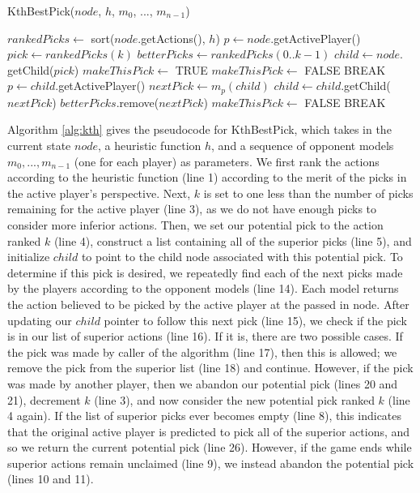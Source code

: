 \documentclass[letterpaper]{article}
\numberwithin{equation}{section}
\numberwithin{theorem}{section}
\numberwithin{lemma}{section}
\numberwithin{df}{section}
\begin{document}
\begin{algorithm}[t]
	\caption{KthBestPick($node$, $h$, $m_0$, ..., $m_{n-1}$)}
	\label{alg:kth}
	\begin{footnotesize}
	\begin{algorithmic}[1]
		\STATE $rankedPicks \gets $ sort($node$.getActions(), $h$)
		\STATE $p \gets node$.getActivePlayer()
			\STATE $pick \gets rankedPicks(k)$
			\STATE $betterPicks \gets rankedPicks(0..k-1)$
			\STATE $child \gets node.$getChild($pick$)
			\STATE $makeThisPick \gets $ TRUE
					\STATE $makeThisPick \gets $ FALSE
					\STATE BREAK
				\ENDIF
				\STATE $p \gets child$.getActivePlayer()
				\STATE $nextPick \gets m_p(child)$
				\STATE $child \gets child.$getChild($nextPick$)
						\STATE $betterPicks.$remove($nextPick$)
					\ELSE
						\STATE $makeThisPick \gets $ FALSE
						\STATE BREAK
					\ENDIF
				\ENDIF
			\ENDWHILE
			\ENDIF
		\ENDFOR
	\end{algorithmic}
	\end{footnotesize}
\end{algorithm}

Algorithm \ref{alg:kth} gives the pseudocode for KthBestPick, which takes in the current state $node$, a heuristic function $h$, and a sequence of opponent models $m_0, ..., m_{n-1}$ (one for each player) as parameters.  We first rank the actions according to the heuristic function (line 1) according to the merit of the picks in the active player's perspective.  Next, $k$ is set to one less than the number of picks remaining for the active player (line 3), as we do not have enough picks to consider more inferior actions.  Then, we set our potential pick to the action ranked $k$ (line 4), construct a list containing all of the superior picks (line 5), and initialize $child$ to point to the child node associated with this potential pick.  To determine if this pick is desired, we repeatedly find each of the next picks made by the players according to the opponent models (line 14).  Each model returns the action believed to be picked by the active player at the passed in node.  After updating our $child$ pointer to follow this next pick (line 15), we check if the pick is in our list of superior actions (line 16).  If it is, there are two possible cases.  If the pick was made by caller of the algorithm (line 17), then this is allowed; we remove the pick from the superior list (line 18) and continue.  However, if the pick was made by another player, then we abandon our potential pick (lines 20 and 21), decrement $k$ (line 3), and now consider the new potential pick ranked $k$ (line 4 again).  If the list of superior picks ever becomes empty (line 8), this indicates that the original active player is predicted to pick all of the superior actions, and so we return the current potential pick (line 26).  However, if the game ends while superior actions remain unclaimed (line 9), we instead abandon the potential pick (lines 10 and 11). 
\end{document}
